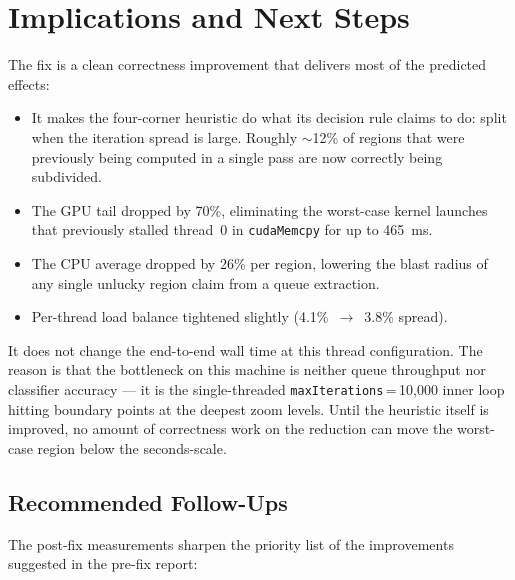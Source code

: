 \documentclass[
	english,
	letterpaper, oneside
]{article}
\begin{document}
\section{Implications and Next Steps}

The fix is a clean correctness improvement that delivers most of the
predicted effects:

\begin{itemize}
    \item It makes the four-corner heuristic do what its decision rule
    claims to do: split when the iteration spread is large.
    Roughly $\sim$12\% of regions that were previously being computed
    in a single pass are now correctly being subdivided.
    \item The GPU tail dropped by 70\%, eliminating the worst-case
    kernel launches that previously stalled thread~0 in
    \texttt{cudaMemcpy} for up to 465~ms.
    \item The CPU average dropped by 26\% per region, lowering the
    blast radius of any single unlucky region claim from a queue
    extraction.
    \item Per-thread load balance tightened slightly (4.1\%~$\to$~3.8\%
    spread).
\end{itemize}

\noindent
It does not change the end-to-end wall time at this thread
configuration. The reason is that the bottleneck on this machine is
neither queue throughput nor classifier accuracy --- it is the
single-threaded \texttt{maxIterations}\,=\,10{,}000 inner loop hitting
boundary points at the deepest zoom levels. Until the heuristic itself
is improved, no amount of correctness work on the reduction can move
the worst-case region below the seconds-scale.

\subsection{Recommended Follow-Ups}

The post-fix measurements sharpen the priority list of the
improvements suggested in the pre-fix report:
\end{document}
